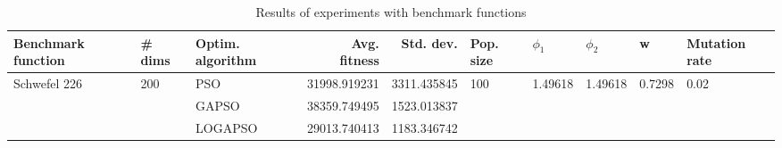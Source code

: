 \begin{table}
\centering
\caption{Results of experiments with benchmark functions}
\begin{tabular}{lllrrlllll}
\toprule
           Benchmark function &              \# dims & Optim. algorithm &  Avg. fitness &   Std. dev. &            Pop. size &               $\phi_{1}$ &               $\phi_{2}$ &                       w &         Mutation rate \\
\midrule
\multirow{3}{*}{Schwefel 226} & \multirow{3}{*}{200} &              PSO &  31998.919231 & 3311.435845 & \multirow{3}{*}{100} & \multirow{3}{*}{1.49618} & \multirow{3}{*}{1.49618} & \multirow{3}{*}{0.7298} & \multirow{3}{*}{0.02} \\
                              &                      &            GAPSO &  38359.749495 & 1523.013837 &                      &                          &                          &                         &                       \\
                              &                      &          LOGAPSO &  29013.740413 & 1183.346742 &                      &                          &                          &                         &                       \\
\bottomrule
\end{tabular}
\end{table}
